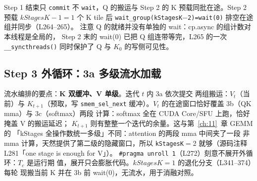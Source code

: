 



Step 1 结束只 \texttt{commit} 不 \texttt{wait}，Q 的搬运与 Step 2 的
K 预载同批在途。Step 2 预载 $kStagesK{-}1=1$ 个 K tile 后
\texttt{wait\_\allowbreak{}group\allowbreak{}(k\allowbreak{}Stages\allowbreak{}K$-$2)=\allowbreak{}wait\allowbreak{}(0)} 排空在途组并同步（L264--265）。
注意 Q 的就绪并没有单独的 wait：cp.async 的组计数对本线程是全局的，
Step 2 末的 wait(0) 已把 Q 组连带等完，L265 的一次
\texttt{\_\allowbreak{}\_\allowbreak{}syncthreads\allowbreak{}()} 同时保护了 Q 与 $K_0$ 的写侧可见性。

\subsection{Step 3 外循环：3a 多级流水加载}





流水编排的要点：\textbf{K 双缓冲、V 单级}。迭代 $t$ 内 3a 依次提交
两组搬运：$V_t$（当前）与 $K_{t+1}$（预取，写 \texttt{smem\_\allowbreak{}sel\_\allowbreak{}next}
缓冲）。$V_t$ 的在途窗口恰好覆盖 3b（QK mma）与 3c（softmax）两段
计算：softmax 全在 CUDA Core/SFU 上跑，恰好掩盖 V 的搬运延迟；
$K_{t+1}$ 则有整整一个迭代的余量。这与第~\ref{ch:11}~章 GEMM 的
「kStages 全操作数统一多级」不同：attention 的两段 mma 中间夹了一段
非 mma 计算，天然提供了第二级的隐藏窗口，所以 \texttt{kStagesK}$=$2
就够（源码注释 L281「one stage is enough for V」）。
\texttt{\#pragma unroll 1}（L272）刻意不展开外循环：$T_c$ 是运行期
值，展开只会膨胀代码。$kStagesK{=}1$ 的退化分支（L341--374）每轮
现搬当前 K 并在 3b 前 wait(0)，无流水，用于消融对照。


